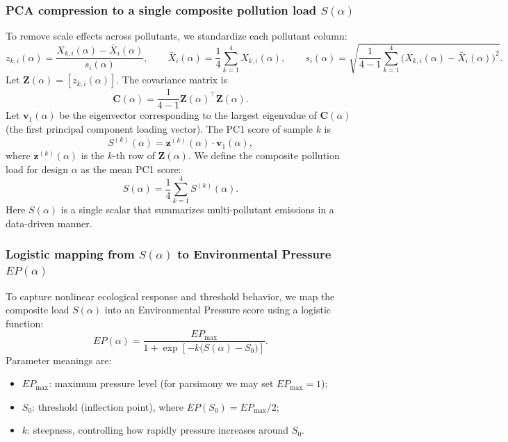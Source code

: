\documentclass{mcmthesis}
\begin{document}
\subsubsection{PCA compression to a single composite pollution load $S(\alpha)$}
To remove scale effects across pollutants, we standardize each pollutant column:
\begin{equation}
z_{k,i}(\alpha)=\frac{X_{k,i}(\alpha)-\bar{X}_i(\alpha)}{s_i(\alpha)},
\qquad
\bar{X}_i(\alpha)=\frac{1}{4}\sum_{k=1}^{4}X_{k,i}(\alpha),
\qquad
s_i(\alpha)=\sqrt{\frac{1}{4-1}\sum_{k=1}^{4}\big(X_{k,i}(\alpha)-\bar{X}_i(\alpha)\big)^2}.
\label{eq:env_standardize_X}
\end{equation}
Let $\mathbf{Z}(\alpha)=[z_{k,i}(\alpha)]$. The covariance matrix is
\[
\mathbf{C}(\alpha)=\frac{1}{4-1}\mathbf{Z}(\alpha)^\top\mathbf{Z}(\alpha).
\]
Let $\mathbf{v}_1(\alpha)$ be the eigenvector corresponding to the largest eigenvalue of $\mathbf{C}(\alpha)$ (the first principal component loading vector). The PC1 score of sample $k$ is
\begin{equation}
S^{(k)}(\alpha)=\mathbf{z}^{(k)}(\alpha)\cdot \mathbf{v}_1(\alpha),
\label{eq:env_PC1_score}
\end{equation}
where $\mathbf{z}^{(k)}(\alpha)$ is the $k$-th row of $\mathbf{Z}(\alpha)$. We define the composite pollution load for design $\alpha$ as the mean PC1 score:
\begin{equation}
S(\alpha)=\frac{1}{4}\sum_{k=1}^{4} S^{(k)}(\alpha).
\label{eq:env_S_alpha}
\end{equation}
Here $S(\alpha)$ is a single scalar that summarizes multi-pollutant emissions in a data-driven manner.

\subsubsection{Logistic mapping from $S(\alpha)$ to Environmental Pressure $EP(\alpha)$}
To capture nonlinear ecological response and threshold behavior, we map the composite load $S(\alpha)$ into an Environmental Pressure score using a logistic function:
\begin{equation}
EP(\alpha)=\frac{EP_{\max}}{1+\exp\!\left[-k\big(S(\alpha)-S_0\big)\right]}.
\label{eq:env_EP_logistic}
\end{equation}
Parameter meanings are:
\begin{itemize}
\item $EP_{\max}$: maximum pressure level (for parsimony we may set $EP_{\max}=1$);
\item $S_0$: threshold (inflection point), where $EP(S_0)=EP_{\max}/2$;
\item $k$: steepness, controlling how rapidly pressure increases around $S_0$.
\end{itemize}
\end{document}
